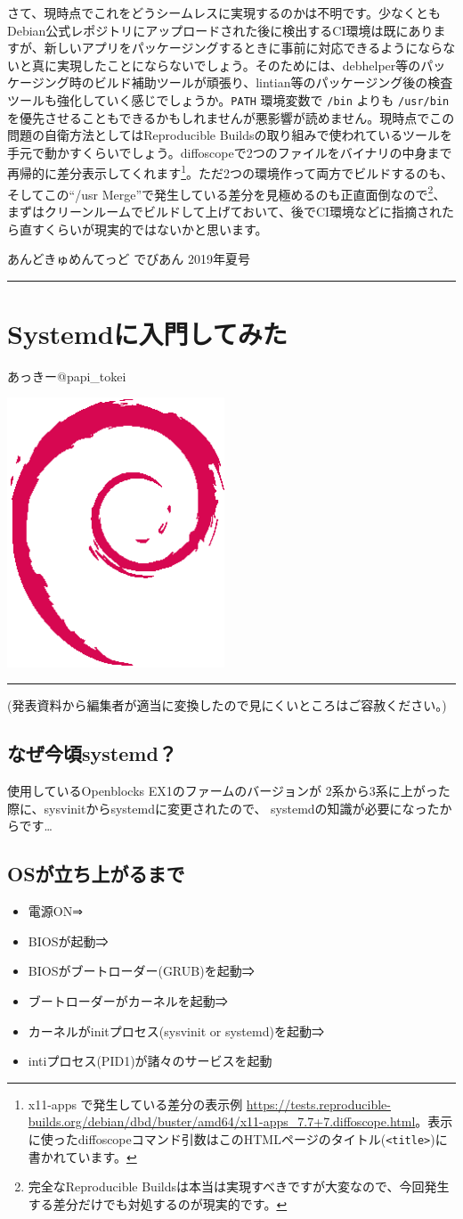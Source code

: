 \documentclass[mingoth,a4paper]{jsarticle}
\renewcommand{\dancersection}[2]{%
\newpage
あんどきゅめんてっど でびあん 2019年夏号
%
\vspace{0.1mm}\\
{\color{dancerdarkblue}\rule{\hsize}{2mm}}

%
%
\begin{minipage}[t]{0.6\hsize}
\color{dancerdarkblue}
\vspace{1cm}
\section{#1}
\hfill{}#2\\
\end{minipage}
\begin{minipage}[t]{0.4\hsize}
\vspace{-2cm}
\hfill{}\includegraphics[height=8cm]{image200502/openlogo-nd.eps}\\
\vspace{-5cm}
\end{minipage}
%
{\color{dancerlightblue}\rule{0.66\hsize}{2mm}}
%
\vspace{2cm}
}
\begin{document}
さて、現時点でこれをどうシームレスに実現するのかは不明です。少なくともDebian公式レポジトリにアップロードされた後に検出するCI環境は既にありますが、新しいアプリをパッケージングするときに事前に対応できるようにならないと真に実現したことにならないでしょう。そのためには、debhelper等のパッケージング時のビルド補助ツールが頑張り、lintian等のパッケージング後の検査ツールも強化していく感じでしょうか。\verb|PATH| 環境変数で \verb|/bin| よりも \verb|/usr/bin| を優先させることもできるかもしれませんが悪影響が読めません。現時点でこの問題の自衛方法としてはReproducible Buildsの取り組みで使われているツールを手元で動かすくらいでしょう。diffoscopeで2つのファイルをバイナリの中身まで再帰的に差分表示してくれます\footnote{x11-apps で発生している差分の表示例 \url{https://tests.reproducible-builds.org/debian/dbd/buster/amd64/x11-apps_7.7+7.diffoscope.html}。表示に使ったdiffoscopeコマンド引数はこのHTMLページのタイトル(\texttt{<title>})に書かれています。}。ただ2つの環境作って両方でビルドするのも、そしてこの``/usr Merge''で発生している差分を見極めるのも正直面倒なので\footnote{完全なReproducible Buildsは本当は実現すべきですが大変なので、今回発生する差分だけでも対処するのが現実的です。}、まずはクリーンルームでビルドして上げておいて、後でCI環境などに指摘されたら直すくらいが現実的ではないかと思います。

\dancersection{Systemdに入門してみた}{あっきー@papi\_tokei}

(発表資料から編集者が適当に変換したので見にくいところはご容赦ください。)

\subsection{なぜ今頃systemd？}
使用しているOpenblocks EX1のファームのバージョンが
2系から3系に上がった際に、sysvinitからsystemdに変更されたので、
systemdの知識が必要になったからです…

\subsection{OSが立ち上がるまで}

\begin{itemize}
 \item 電源ON⇒
 \item BIOSが起動⇒
 \item BIOSがブートローダー(GRUB)を起動⇒
 \item ブートローダーがカーネルを起動⇒
 \item カーネルがinitプロセス(sysvinit or systemd)を起動⇒
 \item intiプロセス(PID1)が諸々のサービスを起動
\end{itemize}
\end{document}

